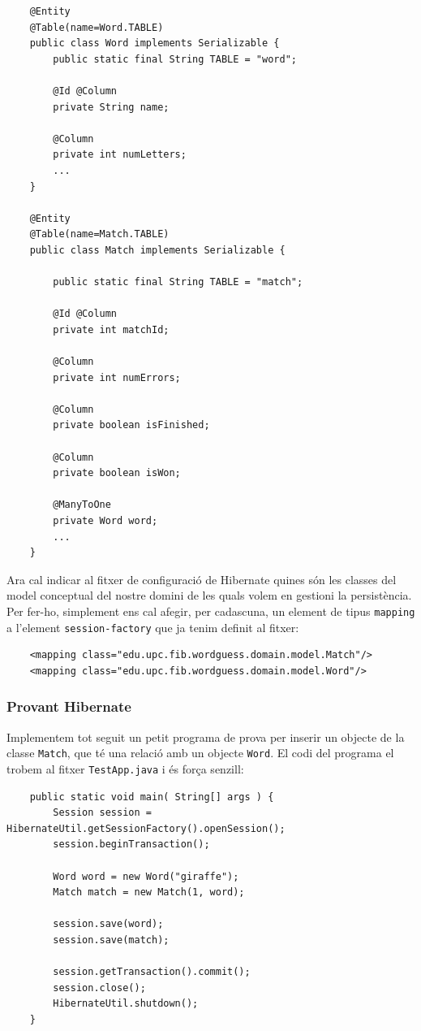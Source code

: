\begin{verbatim}
    @Entity
    @Table(name=Word.TABLE)
    public class Word implements Serializable {
        public static final String TABLE = "word";
        
        @Id @Column
        private String name;
        
        @Column
        private int numLetters;
        ...
    }
    
    @Entity
    @Table(name=Match.TABLE)
    public class Match implements Serializable {
    
        public static final String TABLE = "match";
    	
        @Id @Column
        private int matchId;
    	
        @Column
        private int numErrors;
    	
        @Column
        private boolean isFinished;
    	
        @Column
        private boolean isWon;
    	
        @ManyToOne
        private Word word;
        ...
    }
\end{verbatim}

Ara cal indicar al fitxer de configuració de Hibernate quines són les classes del model conceptual del nostre domini de les quals volem en gestioni la persistència. Per fer-ho, simplement ens cal afegir, per cadascuna, un element de tipus \texttt{mapping} a l'element \texttt{session-factory} que ja tenim definit al fitxer:

\begin{verbatim}
    <mapping class="edu.upc.fib.wordguess.domain.model.Match"/>
    <mapping class="edu.upc.fib.wordguess.domain.model.Word"/>
\end{verbatim}

\subsubsection{Provant Hibernate}
Implementem tot seguit un petit programa de prova per inserir un objecte de la classe \texttt{Match}, que té una relació amb un objecte \texttt{Word}. El codi del programa el trobem al fitxer \texttt{TestApp.java} i és força senzill:

\begin{verbatim}
    public static void main( String[] args ) {
        Session session = HibernateUtil.getSessionFactory().openSession();
        session.beginTransaction();
        
        Word word = new Word("giraffe");
        Match match = new Match(1, word);
        
        session.save(word);
        session.save(match);
        
        session.getTransaction().commit();
        session.close();
        HibernateUtil.shutdown();
    }
\end{verbatim}

